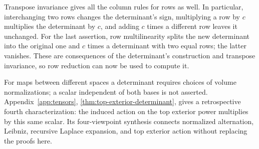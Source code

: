 Transpose invariance gives all the column rules for rows as well.
In particular, interchanging two rows changes the determinant's sign,
multiplying a row by $c$ multiplies the determinant by $c$, and adding
$c$ times a different row leaves it unchanged. For the last assertion,
row multilinearity splits the new determinant into the original one and
$c$ times a determinant with two equal rows; the latter vanishes.
These are consequences of the determinant's construction and transpose
invariance, so row reduction can now be used to compute it.

For maps between different spaces a determinant requires choices of volume
normalizations; a scalar independent of both bases is not asserted.
Appendix~\ref{app:tensors}, \cref{thm:top-exterior-determinant}, gives a
retrospective fourth characterization: the induced action on the top
exterior power multiplies by this same scalar. Its four-viewpoint synthesis
connects normalized alternation, Leibniz, recursive Laplace expansion, and
top exterior action without replacing the proofs here.

